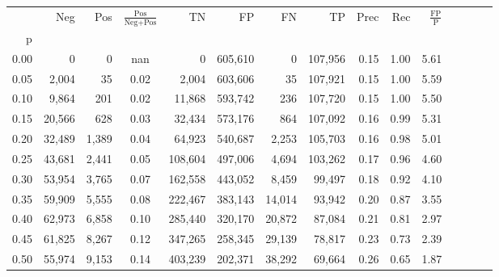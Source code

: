 \begin{tabular}{rrrcrrrrrrrrrrr}
\toprule
{} &     Neg &     Pos & $\frac{\text{Pos}}{\text{Neg}+\text{Pos}}$ &       TN &       FP &       FN &       TP &  Prec &   Rec & $\frac{\text{FP}}{\text{P}}$ \\
p    &         &         &                                            &          &          &          &          &       &       &                              \\
\midrule
0.00 &       0 &       0 &                                        nan &        0 &  605,610 &        0 &  107,956 &  0.15 &  1.00 &                         5.61 \\
0.05 &   2,004 &      35 &                                       0.02 &    2,004 &  603,606 &       35 &  107,921 &  0.15 &  1.00 &                         5.59 \\
0.10 &   9,864 &     201 &                                       0.02 &   11,868 &  593,742 &      236 &  107,720 &  0.15 &  1.00 &                         5.50 \\
0.15 &  20,566 &     628 &                                       0.03 &   32,434 &  573,176 &      864 &  107,092 &  0.16 &  0.99 &                         5.31 \\
0.20 &  32,489 &   1,389 &                                       0.04 &   64,923 &  540,687 &    2,253 &  105,703 &  0.16 &  0.98 &                         5.01 \\
0.25 &  43,681 &   2,441 &                                       0.05 &  108,604 &  497,006 &    4,694 &  103,262 &  0.17 &  0.96 &                         4.60 \\
0.30 &  53,954 &   3,765 &                                       0.07 &  162,558 &  443,052 &    8,459 &   99,497 &  0.18 &  0.92 &                         4.10 \\
0.35 &  59,909 &   5,555 &                                       0.08 &  222,467 &  383,143 &   14,014 &   93,942 &  0.20 &  0.87 &                         3.55 \\
0.40 &  62,973 &   6,858 &                                       0.10 &  285,440 &  320,170 &   20,872 &   87,084 &  0.21 &  0.81 &                         2.97 \\
0.45 &  61,825 &   8,267 &                                       0.12 &  347,265 &  258,345 &   29,139 &   78,817 &  0.23 &  0.73 &                         2.39 \\
0.50 &  55,974 &   9,153 &                                       0.14 &  403,239 &  202,371 &   38,292 &   69,664 &  0.26 &  0.65 &                         1.87 \\

\end{tabular}
